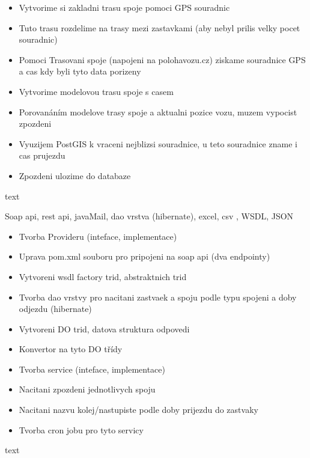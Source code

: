 \begin{itemize}
	\item Vytvorime si zakladni trasu spoje pomoci GPS souradnic
	\item Tuto trasu rozdelime na trasy mezi zastavkami (aby nebyl prilis velky pocet souradnic)
	\item Pomoci Trasovani spoje (napojeni na polohavozu.cz) ziskame souradnice GPS a cas kdy byli tyto data porizeny
	\item Vytvorime modelovou trasu spoje s casem
	\item Porovanáním modelove trasy spoje a aktualni pozice vozu, muzem vypocist zpozdeni
	\item Vyuzijem PostGIS k vraceni nejblizsi souradnice, u teto souradnice zname i cas prujezdu
	\item Zpozdeni ulozime do databaze
\end{itemize}

text


Soap api, rest api, javaMail, dao vrstva (hibernate), excel, csv , WSDL, JSON

\begin{itemize}
	\item Tvorba Provideru (inteface, implementace)
	\item Uprava pom.xml souboru pro pripojeni na soap api (dva endpointy)
	\item Vytvoreni wsdl factory trid, abstraktnich trid
	\item Tvorba dao vrstvy pro nacitani zastvaek a spoju podle typu spojeni a doby odjezdu (hibernate)
	\item Vytvoreni DO trid, datova struktura odpovedi  
	\item Konvertor na tyto DO třídy
	\item Tvorba service (inteface, implementace)
	\item Nacitani zpozdeni jednotlivych spoju
	\item Nacitani nazvu kolej/nastupiste podle doby prijezdu do zastvaky
	\item Tvorba cron jobu pro tyto servicy
\end{itemize}

text

